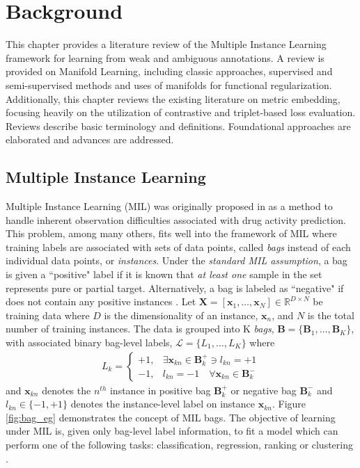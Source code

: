 \chapter{Background}

This chapter provides a literature review of the Multiple Instance Learning framework for learning from weak and ambiguous annotations.  A review is provided on Manifold Learning, including classic approaches, supervised and semi-supervised methods and uses of manifolds for functional regularization. Additionally, this chapter reviews the existing literature on metric embedding, focusing heavily on the utilization of contrastive and triplet-based loss evaluation.  Reviews describe basic terminology and definitions.  Foundational approaches are elaborated and advances are addressed.

\section{Multiple Instance Learning}

Multiple Instance Learning (MIL) was originally proposed in \citep{Dietterich1996AxisParallelRectangles} as a method to handle inherent observation difficulties associated with drug activity prediction.  This problem, among many others, fits well into the framework of MIL where training labels are associated with sets of data points, called \textit{bags} instead of each individual data points, or \textit{instances}.  Under the \textit{standard MIL assumption}, a bag is given a ``positive" label if it is known that  \textit{at least one} sample in the set represents pure or partial target.  Alternatively, a bag is labeled as ``negative" if does not contain any positive instances \citep{Carbonneau2016MILSurvey}.  Let $\bm{X}=[\bm{x}_1,\dots, \bm{x}_N] \in \mathbb{R}^{D \times N}$ be training data where $D$ is the dimensionality of an instance, $\bm{x}_n$, and $N$ is the total number of training instances.  The data is grouped into K \textit{bags}, $\bm{B} = \{\bm{B}_1, \dots, \bm{B}_K\}$, with associated binary bag-level labels, $\mathcal{L} = \{L_1, \dots, L_K \}$ where 
\begin{align}
	L_k = \begin{cases} 
	+1, & \exists \bm{x}_{kn} \in \bm{B}^{+}_{k} \ni  l_{kn} = +1\\
	-1, & l_{kn} = -1 \quad \forall \bm{x}_{kn} \in \bm{B}^{-}_{k} 
	\end{cases}
\end{align} and $\bm{x}_{kn}$ denotes the $n^{th}$ instance in positive bag $\bm{B}^{+}_{k}$ or negative bag $\bm{B}^{-}_{k}$ \citep{Zare2016MIACE} and $l_{kn} \in \{ -1, +1\}$ denotes the instance-level label on instance $\bm{x}_{kn}$.  Figure \ref{fig:bag_eg} demonstrates the concept of MIL bags.  The objective of learning under MIL is, given only bag-level label information, to fit a model which can perform one of the following tasks: classification, regression, ranking or clustering \citep{Carbonneau2016MILSurvey}.

